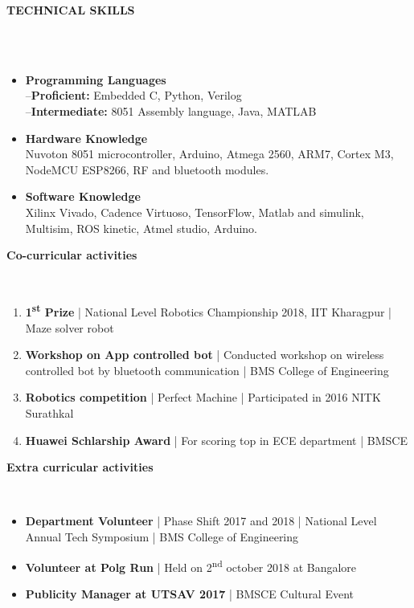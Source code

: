 \documentclass[a4paper,10pt]{article}
\newcommand{\lsep}{-0.5cm}
\newcommand{\resheading}[1]{{\small \colorbox{mygrey}{\begin{minipage}{0.975\textwidth}{\textbf{#1 \vphantom{p\^{E}}}}\end{minipage}}}}
\begin{document}
\resheading{\textbf{TECHNICAL SKILLS} }\\\\[\lsep]
\begin{itemize}
\item \noindent \textbf{Programming Languages}\\
     --\textbf{Proficient:} Embedded C, Python, Verilog\\
     --\textbf{Intermediate:} 8051 Assembly language, Java, MATLAB\\
\item\noindent\textbf{Hardware Knowledge}\\
Nuvoton 8051 microcontroller, Arduino, Atmega 2560, ARM7, Cortex M3, NodeMCU ESP8266, RF and bluetooth modules.\\
\item\noindent\textbf{Software Knowledge}\\
Xilinx Vivado, Cadence Virtuoso, TensorFlow, Matlab and simulink, Multisim, ROS kinetic, Atmel studio, Arduino.
\end{itemize}



\resheading{\textbf{Co-curricular activities} }\\[\lsep]
\begin{enumerate}
\item\noindent \textbf{1\textsuperscript{st} Prize} | National Level Robotics Championship 2018, IIT Kharagpur | Maze solver robot
\item\noindent \textbf{Workshop on App controlled bot} | Conducted workshop on wireless controlled bot by bluetooth communication | BMS College of Engineering
\item\noindent\textbf{Robotics competition} | Perfect Machine | Participated in 2016 NITK Surathkal
\item\noindent\textbf{Huawei Schlarship Award} | For scoring top in ECE department | BMSCE
\end{enumerate}

\resheading{\textbf{Extra curricular activities} }\\[\lsep]
\begin{itemize}
\item \noindent \textbf{Department Volunteer} | Phase Shift 2017 and 2018 | National Level Annual Tech Symposium | BMS College of Engineering
\item \noindent \textbf{Volunteer at Polg Run} | Held on 2\textsuperscript{nd} october 2018 at Bangalore 
\item \noindent \textbf{Publicity Manager at UTSAV 2017} | BMSCE Cultural Event
\end{itemize}
\end{document}
